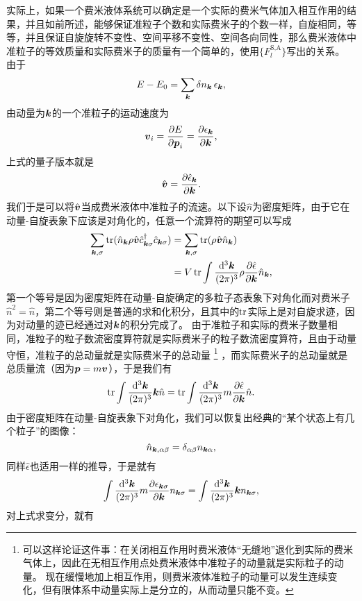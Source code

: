 \documentclass[hyperref, UTF8, a4paper]{ctexart}
\begin{document}
实际上，如果一个费米液体系统可以确定是一个实际的费米气体加入相互作用的结果，并且如前所述，能够保证准粒子个数和实际费米子的个数一样，自旋相同，等等，并且保证自旋旋转不变性、空间平移不变性、空间各向同性，那么费米液体中准粒子的等效质量和实际费米子的质量有一个简单的，使用$\{F_l^\text{S,A}\}$写出的关系。
由于
\[
    E - E_0 = \sum_{\vb*{k}} \var{n_{\vb*{k}}} \epsilon_{\vb*{k}},
\]
由动量为$\vb*{k}$的一个准粒子的运动速度为
\[
    \vb*{v}_i = \pdv{E}{\vb*{p}_i} = \pdv{\epsilon_{\vb*{k}}}{\vb*{k}},
\]
上式的量子版本就是
\[
    \hat{\vb*{v}} = \pdv{\hat{\epsilon}_{\vb*{k}}}{\vb*{k}}.
\]
我们于是可以将$\hat{\vb*{v}}$当成费米液体中准粒子的流速。以下设$\hat{n}$为密度矩阵，由于它在动量-自旋表象下应该是对角化的，任意一个流算符的期望可以写成
\[
    \begin{aligned}
        \sum_{\vb*{k}, \sigma} \trace(\hat{n}_{\vb*{k}} \rho \hat{\vb*{v}} \hat{c}^\dagger_{\vb*{k} \sigma} \hat{c}_{\vb*{k} \sigma}) &= \sum_{\vb*{k}, \sigma} \trace(\rho \hat{\vb*{v}} \hat{n}_{\vb*{k}}) \\
        &= V \trace \int \frac{\dd[3]{\vb*{k}}}{(2\pi)^3} \rho \pdv{\hat{\epsilon}}{\vb*{k}} \hat{n}_{\vb*{k}}, 
    \end{aligned}
\]
第一个等号是因为密度矩阵在动量-自旋确定的多粒子态表象下对角化而对费米子$\hat{n}^2=\hat{n}$，第二个等号则是普通的求和化积分，且其中的$\trace$实际上是对自旋求迹，因为对动量的迹已经通过对$\vb*{k}$的积分完成了。
由于准粒子和实际的费米子数量相同，准粒子的粒子数流密度算符就是实际费米子的粒子数流密度算符，且由于动量守恒，准粒子的总动量就是实际费米子的总动量%
\footnote{
    可以这样论证这件事：在关闭相互作用时费米液体“无缝地”退化到实际的费米气体上，因此在无相互作用点处费米液体中准粒子的动量就是实际粒子的动量。
    现在缓慢地加上相互作用，则费米液体准粒子的动量可以发生连续变化，但有限体系中动量实际上是分立的，从而动量只能不变。
}%
，而实际费米子的总动量就是总质量流（因为$\vb*{p}=m\vb*{v}$），于是我们有
\[
    \trace \int \frac{\dd[3]{\vb*{k}}}{(2\pi)^3} \vb*{k} \hat{n} = \trace \int \frac{\dd[3]{\vb*{k}}}{(2\pi)^3} m \pdv{\hat{\epsilon}}{\vb*{k}} \hat{n}.
\]
由于密度矩阵在动量-自旋表象下对角化，我们可以恢复出经典的“某个状态上有几个粒子”的图像：
\[
    \hat{n}_{\vb*{k}, \alpha \beta} = \delta_{\alpha \beta} n_{\vb*{k} \alpha},
\]
同样$\hat{\epsilon}$也适用一样的推导，于是就有
\[
    \int \frac{\dd[3]{\vb*{k}}}{(2\pi)^3} m \pdv{\epsilon_{\vb*{k} \sigma}}{\vb*{k}} n_{\vb*{k} \sigma} = \int \frac{\dd[3]{\vb*{k}}}{(2\pi)^3} \vb*{k} n_{\vb*{k} \sigma},
\]
对上式求变分，就有
\end{document}
